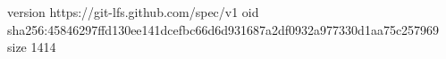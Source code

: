 version https://git-lfs.github.com/spec/v1
oid sha256:45846297ffd130ee141dcefbc66d6d931687a2df0932a977330d1aa75c257969
size 1414
